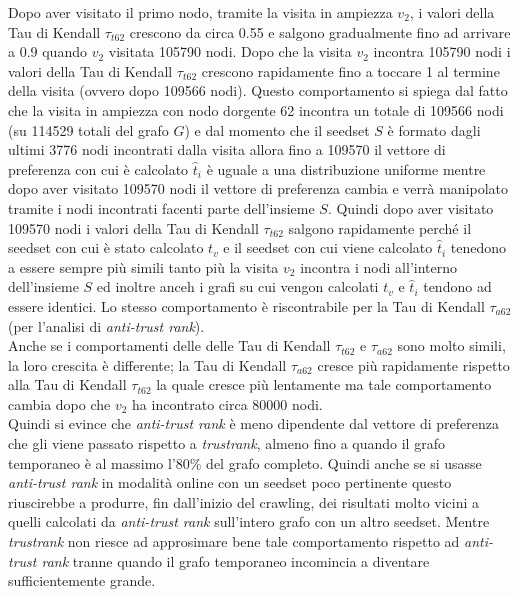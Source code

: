 Dopo aver visitato il primo nodo, tramite la visita in ampiezza \(v_2\), i valori della Tau di Kendall \(\tau_{t62}\) crescono da circa 0.55  e salgono gradualmente fino ad arrivare a 0.9 quando \(v_2\) visitata 105790 nodi. Dopo che  la visita \(v_2\) incontra 105790 nodi i valori della Tau di Kendall \(\tau_{t62}\) crescono rapidamente fino a toccare 1 al termine della visita (ovvero dopo 109566 nodi). Questo comportamento si spiega dal fatto che la visita in ampiezza con nodo dorgente 62 incontra un totale di 109566 nodi (su 114529 totali del grafo \(G\)) e dal momento che il seedset \(S\) è formato dagli ultimi 3776 nodi incontrati dalla visita allora fino a 109570 il vettore di preferenza con cui è calcolato \(\hat{t}_i\) è uguale a una distribuzione uniforme mentre dopo aver visitato 109570 nodi il vettore di preferenza cambia e verrà manipolato tramite i nodi incontrati facenti parte dell'insieme \(S\). Quindi dopo aver visitato 109570 nodi i valori della Tau di Kendall \(\tau_{t62}\) salgono rapidamente perché il seedset con cui è stato calcolato \(t_v\) e il seedset con cui viene calcolato \(\hat{t}_i\) tenedono a essere sempre più simili tanto più la visita \(v_2\) incontra i nodi all'interno dell'insieme \(S\) ed inoltre anceh i grafi su cui vengon calcolati \(t_v\) e \(\hat{t}_i\) tendono ad essere identici. Lo stesso comportamento è riscontrabile per la Tau di Kendall \(\tau_{a62}\) (per l'analisi di \textit{anti-trust rank}).\\ 
Anche se i comportamenti delle delle Tau di Kendall \(\tau_{t62}\) e \(\tau_{a62}\) sono molto simili, la loro crescita è differente; la Tau di Kendall \(\tau_{a62}\) cresce più rapidamente rispetto alla Tau di Kendall \(\tau_{t62}\) la quale cresce più lentamente ma tale comportamento cambia dopo che \(v_2\) ha incontrato circa 80000 nodi.\\
Quindi si evince che \textit{anti-trust rank} è meno dipendente dal vettore di preferenza che gli viene passato rispetto a \textit{trustrank}, almeno fino a quando il grafo temporaneo è al massimo l'80\% del grafo completo. Quindi anche se si usasse \textit{anti-trust rank} in modalità online con un seedset poco pertinente questo riuscirebbe a produrre, fin dall'inizio del crawling, dei risultati molto vicini a quelli calcolati da \textit{anti-trust rank} sull'intero grafo con un altro seedset. Mentre \textit{trustrank} non riesce ad approsimare bene tale comportamento rispetto ad \textit{anti-trust rank} tranne quando il  grafo temporaneo incomincia a diventare sufficientemente grande.

